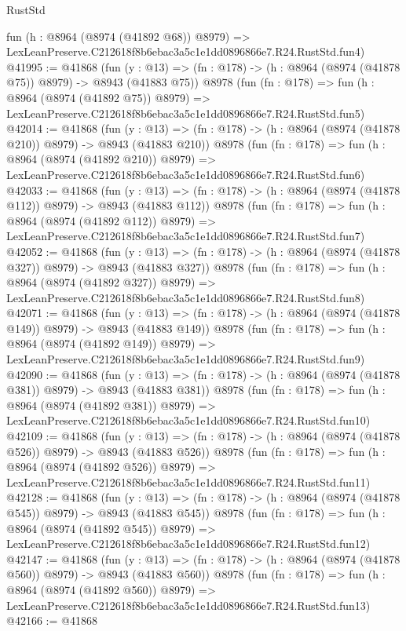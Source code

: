 \begin{lexlean}{RustStd}
\begin{coremodule}
    fun (h : @8964 (@8974 (@41892 @68)) @8979) =>
    LexLeanPreserve.C212618f8b6ebac3a5c1e1dd0896866e7.R24.RustStd.fun4)
@41995 := @41868
    (fun (y : @13) => (fn : @178) -> (h : @8964 (@8974 (@41878 @75)) @8979) -> @8943 (@41883 @75))
    @8978
    (fun (fn : @178) =>
    fun (h : @8964 (@8974 (@41892 @75)) @8979) =>
    LexLeanPreserve.C212618f8b6ebac3a5c1e1dd0896866e7.R24.RustStd.fun5)
@42014 := @41868
    (fun (y : @13) => (fn : @178) -> (h : @8964 (@8974 (@41878 @210)) @8979) -> @8943 (@41883 @210))
    @8978
    (fun (fn : @178) =>
    fun (h : @8964 (@8974 (@41892 @210)) @8979) =>
    LexLeanPreserve.C212618f8b6ebac3a5c1e1dd0896866e7.R24.RustStd.fun6)
@42033 := @41868
    (fun (y : @13) => (fn : @178) -> (h : @8964 (@8974 (@41878 @112)) @8979) -> @8943 (@41883 @112))
    @8978
    (fun (fn : @178) =>
    fun (h : @8964 (@8974 (@41892 @112)) @8979) =>
    LexLeanPreserve.C212618f8b6ebac3a5c1e1dd0896866e7.R24.RustStd.fun7)
@42052 := @41868
    (fun (y : @13) => (fn : @178) -> (h : @8964 (@8974 (@41878 @327)) @8979) -> @8943 (@41883 @327))
    @8978
    (fun (fn : @178) =>
    fun (h : @8964 (@8974 (@41892 @327)) @8979) =>
    LexLeanPreserve.C212618f8b6ebac3a5c1e1dd0896866e7.R24.RustStd.fun8)
@42071 := @41868
    (fun (y : @13) => (fn : @178) -> (h : @8964 (@8974 (@41878 @149)) @8979) -> @8943 (@41883 @149))
    @8978
    (fun (fn : @178) =>
    fun (h : @8964 (@8974 (@41892 @149)) @8979) =>
    LexLeanPreserve.C212618f8b6ebac3a5c1e1dd0896866e7.R24.RustStd.fun9)
@42090 := @41868
    (fun (y : @13) => (fn : @178) -> (h : @8964 (@8974 (@41878 @381)) @8979) -> @8943 (@41883 @381))
    @8978
    (fun (fn : @178) =>
    fun (h : @8964 (@8974 (@41892 @381)) @8979) =>
    LexLeanPreserve.C212618f8b6ebac3a5c1e1dd0896866e7.R24.RustStd.fun10)
@42109 := @41868
    (fun (y : @13) => (fn : @178) -> (h : @8964 (@8974 (@41878 @526)) @8979) -> @8943 (@41883 @526))
    @8978
    (fun (fn : @178) =>
    fun (h : @8964 (@8974 (@41892 @526)) @8979) =>
    LexLeanPreserve.C212618f8b6ebac3a5c1e1dd0896866e7.R24.RustStd.fun11)
@42128 := @41868
    (fun (y : @13) => (fn : @178) -> (h : @8964 (@8974 (@41878 @545)) @8979) -> @8943 (@41883 @545))
    @8978
    (fun (fn : @178) =>
    fun (h : @8964 (@8974 (@41892 @545)) @8979) =>
    LexLeanPreserve.C212618f8b6ebac3a5c1e1dd0896866e7.R24.RustStd.fun12)
@42147 := @41868
    (fun (y : @13) => (fn : @178) -> (h : @8964 (@8974 (@41878 @560)) @8979) -> @8943 (@41883 @560))
    @8978
    (fun (fn : @178) =>
    fun (h : @8964 (@8974 (@41892 @560)) @8979) =>
    LexLeanPreserve.C212618f8b6ebac3a5c1e1dd0896866e7.R24.RustStd.fun13)
@42166 := @41868

\end{coremodule}
\end{lexlean}
